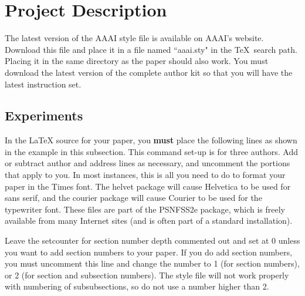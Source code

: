 \documentclass[letterpaper]{article}
\begin{document}
	\section{Project Description}
	
	The latest version of the AAAI style file is available on AAAI's website. Download this file and place it in a file named ``aaai.sty" in the \TeX\ search path. Placing it in the same directory as the paper should also work. You must download the latest version of the complete author kit so that you will have the latest instruction set.
	
	\subsection{Experiments}
	
	In the \LaTeX{} source for your paper, you \textbf{must} place the following lines as shown in the example in this subsection. This command set-up is for three authors. Add or subtract author and address lines as necessary, and uncomment the portions that apply to you. In most instances, this is all you need to do to format your paper in the Times font. The helvet package will cause Helvetica to be used for sans serif, and the courier package will cause Courier to be used for the typewriter font. These files are part of the PSNFSS2e package, which is freely available from many Internet sites (and is often part of a standard installation).
	
	Leave the setcounter for section number depth commented out and set at 0 unless you want to add section numbers to your paper. If you do add section numbers, you must uncomment this line and change the number to 1 (for section numbers), or 2 (for section and subsection numbers). The style file will not work properly with numbering of subsubsections, so do not use a number higher than 2.
	
\end{document}
